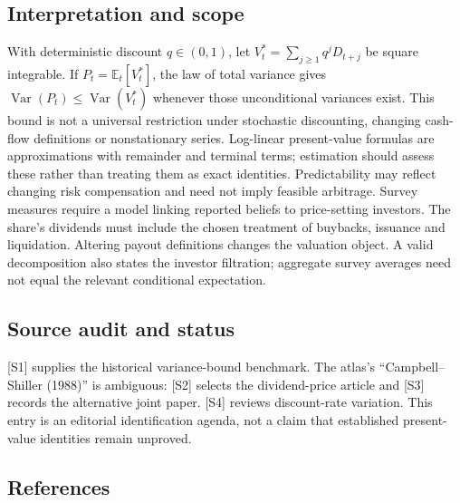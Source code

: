 \documentclass[11pt,a4paper]{article}
\begin{document}
\subsection*{Interpretation and scope}
With deterministic discount $q\in(0,1)$, let $V_t^*=\sum_{j\ge1}q^jD_{t+j}$ be square integrable. If $P_t=\mathbb E_t[V_t^*]$, the law of total variance gives $\operatorname{Var}(P_t)\le\operatorname{Var}(V_t^*)$ whenever those unconditional variances exist. This bound is not a universal restriction under stochastic discounting, changing cash-flow definitions or nonstationary series. Log-linear present-value formulas are approximations with remainder and terminal terms; estimation should assess these rather than treating them as exact identities. Predictability may reflect changing risk compensation and need not imply feasible arbitrage. Survey measures require a model linking reported beliefs to price-setting investors. The share’s dividends must include the chosen treatment of buybacks, issuance and liquidation. Altering payout definitions changes the valuation object. A valid decomposition also states the investor filtration; aggregate survey averages need not equal the relevant conditional expectation.

\subsection*{Source audit and status}
[S1] supplies the historical variance-bound benchmark. The atlas’s ``Campbell–Shiller (1988)'' is ambiguous: [S2] selects the dividend-price article and [S3] records the alternative joint paper. [S4] reviews discount-rate variation. This entry is an editorial identification agenda, not a claim that established present-value identities remain unproved.

\subsection*{References}
\end{document}
